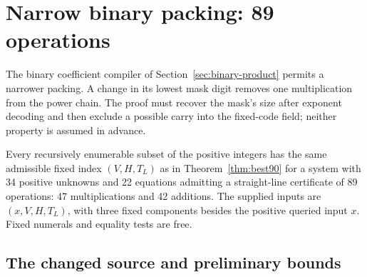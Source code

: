 \section{Narrow binary packing: 89 operations}
\label{sec:narrow-binary-product}

The binary coefficient compiler of Section~\ref{sec:binary-product}
permits a narrower packing. A change in its lowest mask digit removes
one multiplication from the power chain. The proof must recover the
mask's size after exponent decoding and then exclude a possible carry
into the fixed-code field; neither property is assumed in advance.

\begin{theorem}\label{thm:best89}
Every recursively enumerable subset of the positive integers has the
same admissible fixed index $(V,H,T_L)$ as in Theorem~\ref{thm:best90}
for a system with 34 positive unknowns and 22 equations admitting a
straight-line certificate of 89 operations: 47 multiplications and
42 additions. The supplied inputs are $(x,V,H,T_L)$, with three fixed
components besides the positive queried input $x$. Fixed numerals and
equality tests are free.
\end{theorem}

\subsection{The changed source and preliminary bounds}

